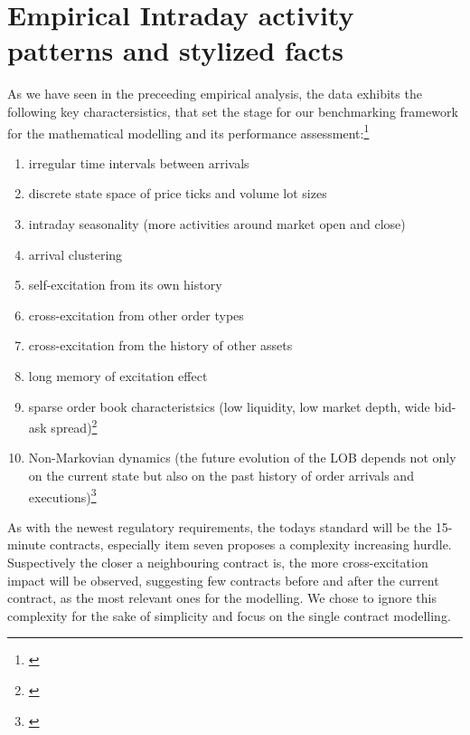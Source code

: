\documentclass[12pt,a4paper]{cau_thesis}
\begin{document}
\section{Empirical Intraday activity patterns and stylized facts}\label{sec:empirical_patterns_and_stylized_facts}
As we have seen in the preceeding empirical analysis, the data
exhibits the following key charactersistics, that set the stage for
our benchmarking framework for the mathematical modelling and its
performance assessment:\footnote{\cite[See ][, p.13]{law2015pure}}
\begin{enumerate}
    \item irregular time intervals between arrivals
    \item discrete state space of price ticks and volume lot sizes
    \item intraday seasonality (more activities around market open and close)
    \item arrival clustering
    \item self-excitation from its own history
    \item cross-excitation from other order types
    \item cross-excitation from the history of other assets
    \item long memory of excitation effect
    \item sparse order book characteristsics (low liquidity, low market depth,
          wide bid-ask spread)\footnote{\cite[See ][,
                  p.236]{balardy2022empirical}}
    \item Non-Markovian dynamics (the future evolution of the LOB depends not
          only on the current state but also on the past history of order
          arrivals and executions)\footnote{\cite[See ][,
                  p.52]{cartea2015algorithmic}}
\end{enumerate}

As with the newest regulatory requirements, the todays standard will
be the 15-minute contracts, especially item seven proposes a
complexity increasing hurdle. Suspectively the closer a neighbouring
contract is, the more cross-excitation impact will be observed,
suggesting few contracts before and after the current contract, as
the most relevant ones for the modelling. We chose to ignore this
complexity for the sake of simplicity and focus on the single
contract modelling.
\end{document}
